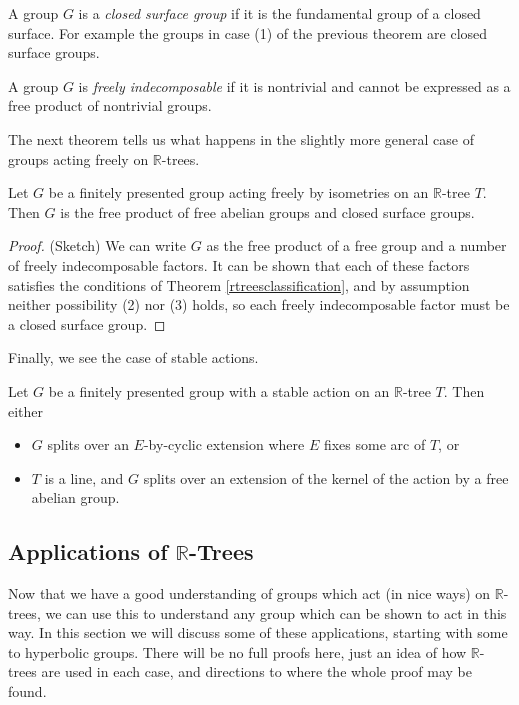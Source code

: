 \begin{definition}
    A group $G$ is a \emph{closed surface group} if it is the fundamental group of a closed surface. For example the groups in case (1) of the previous theorem are closed surface groups.
\end{definition}
\begin{definition}
    A group $G$ is \emph{freely indecomposable} if it is nontrivial and cannot be expressed as a free product of nontrivial groups.
\end{definition}

The next theorem tells us what happens in the slightly more general case of groups acting freely on $\mathbb{R}$-trees.
\begin{theorem}
    Let $G$ be a finitely presented group acting freely by isometries on an $\mathbb{R}$-tree $T$. Then $G$ is the free product of free abelian groups and closed surface groups.
\end{theorem}
\begin{proof} (Sketch)
    We can write $G$ as the free product of a free group and a number of freely indecomposable factors. It can be shown that each of these factors satisfies the conditions of Theorem \ref{rtreesclassification}, and by assumption neither possibility (2) nor (3) holds, so each freely indecomposable factor must be a closed surface group. 
\end{proof}

Finally, we see the case of stable actions.

\begin{theorem}\label{stable}
    Let $G$ be a finitely presented group with a stable action on an $\mathbb{R}$-tree $T$. Then either
    \begin{itemize}
        \item $G$ splits over an $E$-by-cyclic extension where $E$ fixes some arc of $T$, or
        \item $T$ is a line, and $G$ splits over an extension of the kernel of the action by a free abelian group.
    \end{itemize}
\end{theorem}

\subsection{Applications of $\mathbb{R}$-Trees}
Now that we have a good understanding of groups which act (in nice ways) on $\mathbb{R}$-trees, we can use this to understand any group which can be shown to act in this way. In this section we will discuss some of these applications, starting with some to hyperbolic groups. There will be no full proofs here, just an idea of how $\mathbb{R}$-trees are used in each case, and directions to where the whole proof may be found.
